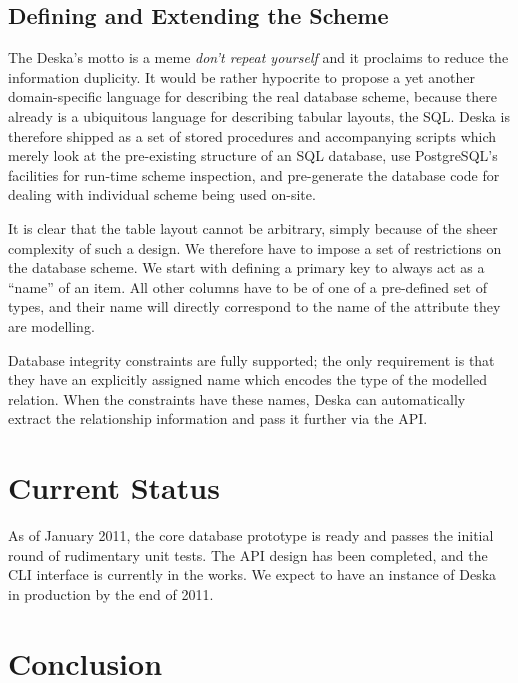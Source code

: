\documentclass[a4paper]{jpconf}
\begin{document}
\subsection{Defining and Extending the Scheme}

The Deska's motto is a meme {\em don't repeat yourself} and it proclaims to reduce the information duplicity.  It would be rather
hypocrite to propose a yet another domain-specific language for describing the real database scheme, because there already is a
ubiquitous language for describing tabular layouts, the SQL.  Deska is therefore shipped as a set of stored procedures and accompanying
scripts which merely look at the pre-existing structure of an SQL database, use PostgreSQL's facilities for run-time scheme inspection,
and pre-generate the database code for dealing with individual scheme being used on-site.

It is clear that the table layout cannot be arbitrary, simply because of the sheer complexity of such a design.  We therefore have to
impose a set of restrictions on the database scheme.  We start with defining a primary key to always act as a ``name'' of an item.  All
other columns have to be of one of a pre-defined set of types, and their name will directly correspond to the name of the attribute
they are modelling.

Database integrity constraints are fully supported; the only requirement is that they have an explicitly assigned name which encodes
the type of the modelled relation.  When the constraints have these names, Deska can automatically extract the relationship information
and pass it further via the API.

\section{Current Status}

As of January 2011, the core database prototype is ready and passes the initial round of rudimentary unit tests.  The API design has
been completed, and the CLI interface is currently in the works. We expect to have an instance of Deska in production by the end of
2011.

\section{Conclusion}
\end{document}
